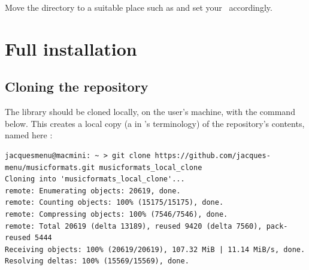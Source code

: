 Move the  directory to a suitable place such as  and set your  \environmentVariable\ accordingly.


\chapter{Full installation}

\section{Cloning the repository}

The library should be cloned locally, on the user's machine, with the command below. This creates a local copy (a  in \git's terminology) of the repository's contents, named here :
\begin{lstlisting}[language=Terminal]
jacquesmenu@macmini: ~ > git clone https://github.com/jacques-menu/musicformats.git musicformats_local_clone
Cloning into 'musicformats_local_clone'...
remote: Enumerating objects: 20619, done.
remote: Counting objects: 100% (15175/15175), done.
remote: Compressing objects: 100% (7546/7546), done.
remote: Total 20619 (delta 13189), reused 9420 (delta 7560), pack-reused 5444
Receiving objects: 100% (20619/20619), 107.32 MiB | 11.14 MiB/s, done.
Resolving deltas: 100% (15569/15569), done.
\end{lstlisting}

